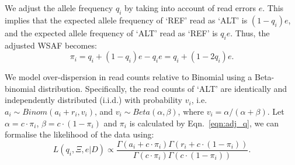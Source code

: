 \documentclass{bioinfo}
\begin{document}
We adjust the allele frequency $q_i$ by taking into account of read errors $e$. This implies that the expected allele frequency of `REF' read as `ALT' is $(1 - q_i)e$, and the expected allele frequency of `ALT' read as `REF' is $q_ie$. Thus, the adjusted WSAF becomes:
\begin{equation}
\pi_i = q_i + (1 - q_i)e - q_ie = q_i + (1 - 2q_i)e.\label{eqn:adj_q}
\end{equation}

We model over-dispersion in read counts relative to Binomial using a Beta-binomial distribution. Specifically, the read counts of `ALT' are identically and independently distributed (i.i.d.) with probability $v_i$, i.e. $a_i \sim Binom(a_i + r_i, v_i)$, and $v_i \sim Beta(\alpha, \beta)$, where $v_i = \alpha/(\alpha+\beta)$. Let $\alpha = c\cdot \pi_{i} $, $\beta = c\cdot (1-\pi_{i})$ and $\pi_i$ is calculated by Eqn.~\eqref{eqn:adj_q}, we can formalise the likelihood of the data using: %
\begin{equation}
L(q_{i}, \Xi, e | D) \propto \frac{\Gamma(a_i + c\cdot \pi_{i}) \Gamma(r_i + c\cdot (1-\pi_{i}))}{\Gamma(c\cdot \pi_{i})\Gamma(c\cdot (1-\pi_{i}))}. \label{eqn:llk}
\end{equation}
\end{document}
